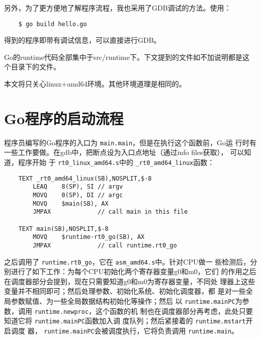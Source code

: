 \documentclass[UTF8,b5paper,fontset=adobe]{ctexart}
\begin{document}
另外，为了更方便地了解程序流程，我也采用了GDB调试的方法。使用：
\begin{verbatim}
    $ go build hello.go
\end{verbatim}
得到的程序即带有调试信息，可以直接进行GDB。

Go的runtime代码全部集中于src/runtime下。下文提到的文件如不加说明都是这
个目录下的文件。

本文将只关心linux+amd64环境。其他环境道理是相同的。

\section{Go程序的启动流程}

程序员编写的Go程序的入口为 \verb+main.main+，但是在执行这个函数前，Go运
行时有一些工作要做。在gdb中，把断点设为入口点地址（通过info files获取），
可以知道，程序开始
于 \verb+rt0_linux_amd64.s+中的 \verb+_rt0_amd64_linux+函数：

\begin{verbatim}
    TEXT _rt0_amd64_linux(SB),NOSPLIT,$-8
        LEAQ    8(SP), SI // argv
        MOVQ    0(SP), DI // argc
        MOVQ    $main(SB), AX
        JMPAX             // call main in this file

    TEXT main(SB),NOSPLIT,$-8
        MOVQ    $runtime·rt0_go(SB), AX
        JMPAX             // call runtime.rt0_go
\end{verbatim}

之后调用了 \verb+runtime.rt0_go+，它在 \verb+asm_amd64.s+中。针对CPU做一
些检测后，分别进行了如下工作：为每个CPU初始化两个寄存器变量g0和m0，它们
的作用之后在调度器部分会提到，现在只需要知道g0和m0为寄存器变量，不同处
理器上这些变量并不相同即可；然后处理参数、初始化系统、初始化调度器，都
是对一些全局参数赋值、为一些全局数据结构初始化等操作；然后
以 \verb+runtime.mainPC+为参数，调用 \verb+runtime.newproc+，这个函数的机
制也在调度器部分再考虑，此处只要知道它将 \verb+runtime.mainPC+函数加入调
度队列；然后紧接着的 \verb+runtime.mstart+开启调度
器， \verb+runtime.mainPC+会被调度执行，它将负责调用 \verb+runtime.main+。
\end{document}
